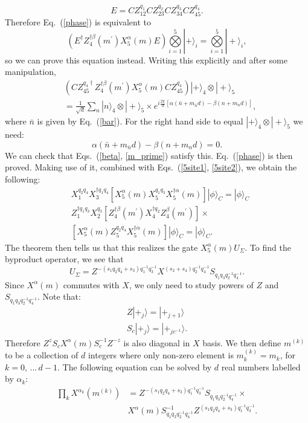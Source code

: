 \documentclass[aps,amsfonts,pra,twocolumn,showpacs]{revtex4-1}
\newcommand{\be}{\begin{equation}}
\newcommand{\ee}{\end{equation}}
\begin{document}
		\be
		E = CZ_{12}^{q_1} CZ_{23}^{q_2} CZ_{34}^{q_3} CZ_{45}^{q_4}.
		\ee
	Therefore Eq.~(\ref{phase}) is equivalent to
		\be
		(E^\dagger Z_4^{\dagger\beta}(m^\prime) X_5^\alpha(m) E) \overset{5}{\underset{i=1}{\bigotimes}} |+\rangle_i = \overset{5}{\underset{i=1}{\bigotimes}} |+\rangle_i,
		\ee
	so we can prove this equation instead. Writing this explicitly and after some manipulation,
		\begin{align}
		& (CZ_{45}^{q_4\dagger} Z_4^{\dagger\beta}(m^\prime) X_5^\alpha(m) CZ_{45}^{q_4}) |+\rangle_4 \otimes |+\rangle_5 \nonumber \\
		& = \frac{1}{\sqrt{d}}\sum_{n} |n\rangle_4 \otimes |+\rangle_5 \times e^{i\frac{2\pi}{d}[\alpha(\bar{n}+m_{\bar{n}}d)-\beta(n+m_nd)]},
		\end{align}
	where $\bar{n}$ is given by Eq.~(\ref{bar}). For the right hand side to equal $|+\rangle_4 \otimes |+\rangle_5$ we need:
		\be
		\alpha(\bar{n}+m_{\bar{n}}d)-\beta(n+m_nd)=0.
		\ee
	We can check that Eqs.~(\ref{beta}, \ref{m_prime}) satisfy this. Eq.~(\ref{phase}) is then proved. Making use of it, combined with Eqs.~(\ref{5site1}, \ref{5site2}), we obtain the following:
		\begin{align}
		& X_1^{q_2q_4} X_3^{\dagger q_1q_4} [X_5^\alpha(m) X_5^{q_1q_3} X_5^{\dagger\alpha}(m)] |\phi\rangle_C = |\phi\rangle_C \\
		& Z_1^{\dagger q_1q_3} X_2^{q_3} [Z_4^{\dagger\beta}(m^\prime) X_4^{\dagger q_2} Z_4^\beta(m^\prime)] \times \nonumber \\
			& [X_5^\alpha(m) Z_5^{q_2q_4} X_5^{\dagger\alpha}(m)] |\phi\rangle_C = |\phi\rangle_C.
		\end{align}
	The theorem then tells us that this realizes the gate $X_5^\alpha(m)U_\Sigma$. To find the byproduct operator, we see that
		\be
		U_\Sigma = Z^{-(s_1q_2q_4+s_3)q_1^{-1}q_3^{-1}} X^{(s_2+s_4)q_2^{-1}q_4^{-1}} S_{q_1q_3q_2^{-1}q_4^{-1}}.
		\ee
	Since $X^\alpha(m)$ commutes with $X$, we only need to study powers of $Z$ and $S_{q_1q_3q_2^{-1}q_4^{-1}}$. Note that:
		\begin{align}
		Z |+_j\rangle = |+_{j+1}\rangle \\
		S_c |+_j\rangle = |+_{jc^{-1}}\rangle.
		\end{align}
	Therefore $Z^zS_c X^\alpha(m) S_c^{-1}Z^{-z}$ is also diagonal in $X$ basis. We then define $m^{(k)}$ to be a collection of $d$ integers where only non-zero element is $m^{(k)}_k=m_k$, for $k=0, \, ... \, d-1$. The following equation can be solved by $d$ real numbers labelled by $\alpha_k$:
		\begin{align}
		\prod_k X^{\alpha_k}(m^{(k)}) & = Z^{-(s_1q_2q_4+s_3)q_1^{-1}q_3^{-1}} S_{q_1q_3q_2^{-1}q_4^{-1}} \times \nonumber \\
			& X^\alpha(m) S_{q_1q_3q_2^{-1}q_4^{-1}}^{-1} Z^{(s_1q_2q_4+s_3)q_1^{-1}q_3^{-1}}.
		\label{basis}
		\end{align}
\end{document}
